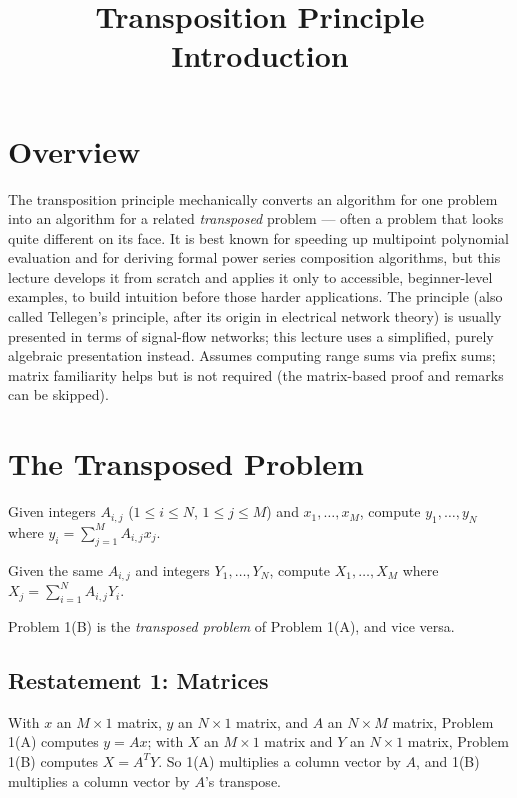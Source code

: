\documentclass[11pt]{article}
\title{Transposition Principle Introduction}
\author{}
\date{}
\begin{document}
\thispagestyle{fancy}


\section{Overview}
The transposition principle mechanically converts an algorithm for one
problem into an algorithm for a related \emph{transposed} problem ---
often a problem that looks quite different on its face. It is best
known for speeding up multipoint polynomial evaluation and for deriving
formal power series composition algorithms, but this lecture develops it
from scratch and applies it only to accessible, beginner-level examples,
to build intuition before those harder applications. The principle
(also called Tellegen's principle, after its origin in electrical
network theory) is usually presented in terms of signal-flow networks;
this lecture uses a simplified, purely algebraic presentation instead.
Assumes computing range sums via prefix sums; matrix familiarity helps
but is not required (the matrix-based proof and remarks can be skipped).

\section{The Transposed Problem}
\begin{definitionbox}[Problem 1(A)]
Given integers $A_{i,j}$ ($1\le i\le N$, $1\le j\le M$) and
$x_1,\ldots,x_M$, compute $y_1,\ldots,y_N$ where
$y_i = \sum_{j=1}^M A_{i,j}x_j$.
\end{definitionbox}
\begin{definitionbox}[Problem 1(B)]
Given the same $A_{i,j}$ and integers $Y_1,\ldots,Y_N$, compute
$X_1,\ldots,X_M$ where $X_j = \sum_{i=1}^N A_{i,j}Y_i$.
\end{definitionbox}
Problem 1(B) is the \emph{transposed problem} of Problem 1(A), and vice
versa.

\subsection{Restatement 1: Matrices}
With $x$ an $M\times1$ matrix, $y$ an $N\times1$ matrix, and $A$ an
$N\times M$ matrix, Problem 1(A) computes $y=Ax$; with $X$ an
$M\times1$ matrix and $Y$ an $N\times1$ matrix, Problem 1(B) computes
$X=A^TY$. So 1(A) multiplies a column vector by $A$, and 1(B)
multiplies a column vector by $A$'s transpose.
\end{document}
